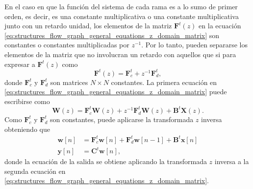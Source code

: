 \documentclass[a4paper]{report}
\newcommand{\x}{\mathbf{x}}
\newcommand{\y}{\mathbf{y}}
\newcommand{\w}{\mathbf{w}}
\newcommand{\C}{\mathbf{C}} %
\newcommand{\B}{\mathbf{B}}
\newcommand{\F}{\mathbf{F}}
\newcommand{\W}{\mathbf{W}}
\newcommand{\X}{\mathbf{X}}
\begin{document}
En el caso en que la función del sistema de cada rama es a lo sumo de primer orden, es decir, es una constante multiplicativa o una constante multiplicativa junto con un retardo unidad, los elementos de la matriz \(\F^t(z)\) en la ecuación \ref{eq:structures_flow_graph_general_equations_z_domain_matrix} son constantes o constantes multiplicadas por \(z^{-1}\). Por lo tanto, pueden separarse los elementos de la matriz que no involucran un retardo con aquellos que si para expresar a \(\F^t(z)\) como
\[
 \F^t(z)=\F_c^t+z^{-1}\F_d^t,
\]
donde \(\F_c^t\) y \(\F_d^t\) son matrices \(N\times N\) constantes. La primera ecuación en \ref{eq:structures_flow_graph_general_equations_z_domain_matrix} puede escribirse como
\[
 \W(z)=\F_c^t\W(z)+z^{-1}\F_d^t\W(z)+\B^t\X(z).
\]
Como \(\F_c^t\) y \(\F_d^t\) son constantes, puede aplicarse la transformada \(z\) inversa obteniendo que 
\begin{equation}\label{eq:structures_flow_graph_general_equations_n_domain_matrix}
 \begin{aligned}
  \w[n]&=\F_c^t\w[n]+\F_d^t\w[n-1]+\B^t\x[n]\\
  \y[n]&=\C^t\w[n],
 \end{aligned}
\end{equation}
donde la ecuación de la salida se obtiene aplicando la transformada \(z\) inversa a la segunda ecuación en \ref{eq:structures_flow_graph_general_equations_z_domain_matrix}. 
\end{document}
